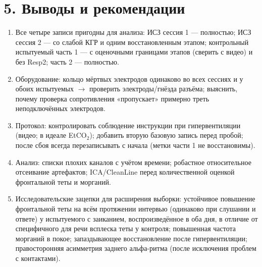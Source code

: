 \documentclass[11pt,a4paper]{article}
\begin{document}
\section*{5. Выводы и рекомендации}
\begin{enumerate}\setlength\itemsep{1pt}
\item Все четыре записи пригодны для анализа: ИСЗ сессия 1 --- полностью; ИСЗ сессия 2 --- со слабой КГР и
одним восстановленным этапом; контрольный испытуемый часть 1 --- с оценочными границами этапов (сверить с видео)
и без Resp2; часть 2 --- полностью.
\item Оборудование: кольцо мёртвых электродов одинаково во всех сессиях и у обоих испытуемых
$\rightarrow$ проверить электроды/гнёзда разъёма; выяснить, почему проверка сопротивления «пропускает»
примерно треть неподключённых электродов.
\item Протокол: контролировать соблюдение инструкции при гипервентиляции (видео; в идеале EtCO$_2$);
добавить вторую базовую запись перед пробой; после сбоя всегда перезаписывать с начала (метки части 1
не восстановимы).
\item Анализ: списки плохих каналов с учётом времени; робастное относительное отсеивание артефактов;
ICA/CleanLine перед количественной оценкой фронтальной теты и морганий.
\item Исследовательские зацепки для расширения выборки: устойчивое повышение фронтальной теты на
всём протяжении интервью (одинаково при слушании и ответе) у испытуемого с заиканием,
воспроизведённое в оба дня, в отличие от специфичного для речи всплеска теты у контроля;
повышенная частота морганий в покое;
запаздывающее восстановление после гипервентиляции; правосторонняя асимметрия заднего альфа-ритма
(после исключения проблем с контактами).
\end{enumerate}
\end{document}
